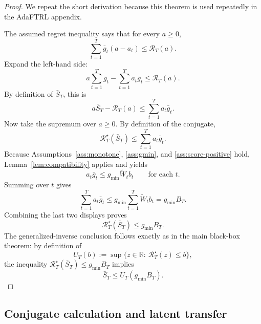 \documentclass[11pt]{article}
\newcommand{\R}{\mathbb{R}}
\newcommand{\1}{\mathbf{1}}
\begin{document}
\begin{proof}
We repeat the short derivation because this theorem is used repeatedly in the AdaFTRL appendix.

The assumed regret inequality says that for every $a\ge 0$,
\[
\sum_{t=1}^T \bar g_t(a-a_t)\le \mathcal R_T(a).
\]
Expand the left-hand side:
\[
a\sum_{t=1}^T \bar g_t-\sum_{t=1}^T a_t\bar g_t\le \mathcal R_T(a).
\]
By definition of $\bar S_T$, this is
\[
a\bar S_T-\mathcal R_T(a)\le \sum_{t=1}^T a_t\bar g_t.
\]
Now take the supremum over $a\ge 0$. By definition of the conjugate,
\[
\mathcal R_T^\star(\bar S_T)\le \sum_{t=1}^T a_t\bar g_t.
\]
Because Assumptions~\ref{ass:monotone}, \ref{ass:gmin}, and \ref{ass:score-positive} hold, Lemma~\ref{lem:compatibility} applies and yields
\[
a_t\bar g_t\le g_{\min}\widetilde W_t b_t
\qquad\text{for each }t.
\]
Summing over $t$ gives
\[
\sum_{t=1}^T a_t\bar g_t\le g_{\min}\sum_{t=1}^T \widetilde W_t b_t=g_{\min}B_T.
\]
Combining the last two displays proves
\[
\mathcal R_T^\star(\bar S_T)\le g_{\min}B_T.
\]
The generalized-inverse conclusion follows exactly as in the main black-box theorem: by definition of
\[
U_T(b):=\sup\{z\in\R:\ \mathcal R_T^\star(z)\le b\},
\]
the inequality $\mathcal R_T^\star(\bar S_T)\le g_{\min}B_T$ implies
\[
\bar S_T\le U_T(g_{\min}B_T).
\]
\end{proof}

\subsection{Conjugate calculation and latent transfer}
\end{document}
